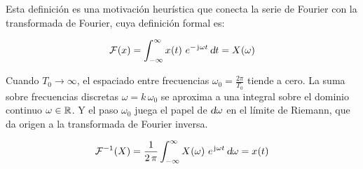 Esta definición es una motivación heurística que conecta la serie de Fourier con la transformada de Fourier, cuya definición formal es:

\begin{mdframed}[style=DefinitionFrame]
    \begin{defn}
        \label{defn:FourierTrans}
    \end{defn}
    \[
        \fourier{x}
        = \int_{-\infty}^\infty \fx[x]{t} \, e^{- \iu \omega t} \, \dif t
        = \fx[X]{\omega}
    \]
\end{mdframed}

Cuando $T_0 \to \infty$, el espaciado entre frecuencias $\omega_0 = \frac{2\pi}{T_0}$ tiende a cero.
La suma sobre frecuencias discretas $\omega = k \, \omega_0$ se aproxima a una integral sobre el dominio continuo $\omega \in \setR$.
Y el paso $\omega_0$ juega el papel de $\dif \omega$ en el límite de Riemann, que da origen a la transformada de Fourier inversa.

\begin{mdframed}[style=DefinitionFrame]
    \begin{defn}
        \label{defn:FourierTransInv}
    \end{defn}
    \[
        \ffourier{X}
        = \frac{1}{2 \, \pi} \int_{-\infty}^\infty \fx[X]{\omega} \, \complexExp \, \dif \omega
        = \fx[x]{t}
    \]
\end{mdframed}